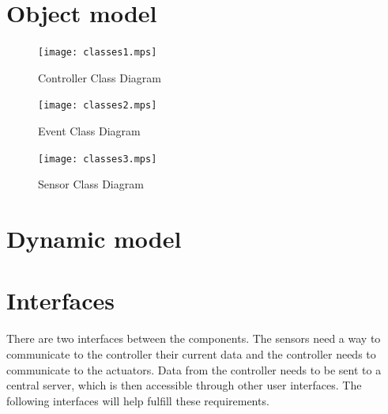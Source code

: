 \documentclass{report}
\begin{document}
\setlength{\parindent}{\originalParindent}
\setlength{\parskip}{\originalParskip}

\section{Object model}


\begin{landscape}
\begin{figure}[hp]
    \centering
        \caption{Controller Class Diagram}
        \scriptsize
        \setlength{\unitlength}{2.0em}
        \texttt{[image: classes1.mps]}
        \normalsize
    \label{fig:controller_class_diagram}
\end{figure}
\end{landscape}

\begin{landscape}
\begin{figure}[hp]
    \centering
        \caption{Event Class Diagram}
        \scriptsize
        \setlength{\unitlength}{2.0em}
        \texttt{[image: classes2.mps]}
        \normalsize
    \label{fig:event_class_diagram}
\end{figure}
\end{landscape}

\begin{landscape}
\begin{figure}[hp]
    \centering
        \caption{Sensor Class Diagram}
        \scriptsize
        \setlength{\unitlength}{2.0em}
        \texttt{[image: classes3.mps]}
        \normalsize
    \label{fig:sensor_class_diagram}
\end{figure}
\end{landscape}




\section{Dynamic model}


\section{Interfaces}
There are two interfaces between the components. The sensors need a way to
communicate to the controller their current data and the controller needs to
communicate to the actuators. Data from the controller needs to be sent to a
central server, which is then accessible through other user interfaces. The following
interfaces will help fulfill these requirements.
\end{document}
